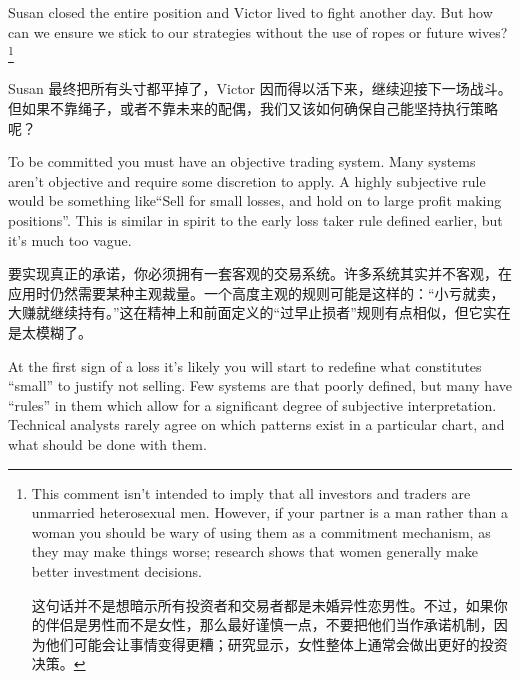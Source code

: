 \bipairgap

\begin{englishblock} Susan closed the entire position and Victor lived to fight another day. But how can we ensure we stick to our strategies without the use of ropes or future wives?\footnote{This comment isn't intended to imply that all investors and traders are unmarried heterosexual men. However, if your partner is a man rather than a woman you should be wary of using them as a commitment mechanism, as they may make things worse; research shows that women generally make better investment decisions. \par 这句话并不是想暗示所有投资者和交易者都是未婚异性恋男性。不过，如果你的伴侣是男性而不是女性，那么最好谨慎一点，不要把他们当作承诺机制，因为他们可能会让事情变得更糟；研究显示，女性整体上通常会做出更好的投资决策。}\end{englishblock}

\begin{chineseblock} Susan 最终把所有头寸都平掉了，Victor 因而得以活下来，继续迎接下一场战斗。但如果不靠绳子，或者不靠未来的配偶，我们又该如何确保自己能坚持执行策略呢？\end{chineseblock}


\begin{englishblock} To be committed you must have an objective trading system. Many systems aren't objective and require some discretion to apply. A highly subjective rule would be something like``Sell for small losses, and hold on to large profit making positions''. This is similar in spirit to the early loss taker rule defined earlier, but it's much too vague. \end{englishblock}

\begin{chineseblock}要实现真正的承诺，你必须拥有一套客观的交易系统。许多系统其实并不客观，在应用时仍然需要某种主观裁量。一个高度主观的规则可能是这样的：“小亏就卖，大赚就继续持有。”这在精神上和前面定义的“过早止损者”规则有点相似，但它实在是太模糊了。\end{chineseblock}

\bipairgap

\begin{englishblock} At the first sign of a loss it's likely you will start to redefine what constitutes ``small'' to justify not selling. Few systems are that poorly defined, but many have ``rules'' in them which allow for a significant degree of subjective interpretation. Technical analysts rarely agree on which patterns exist in a particular chart, and what should be done with them. \end{englishblock}

